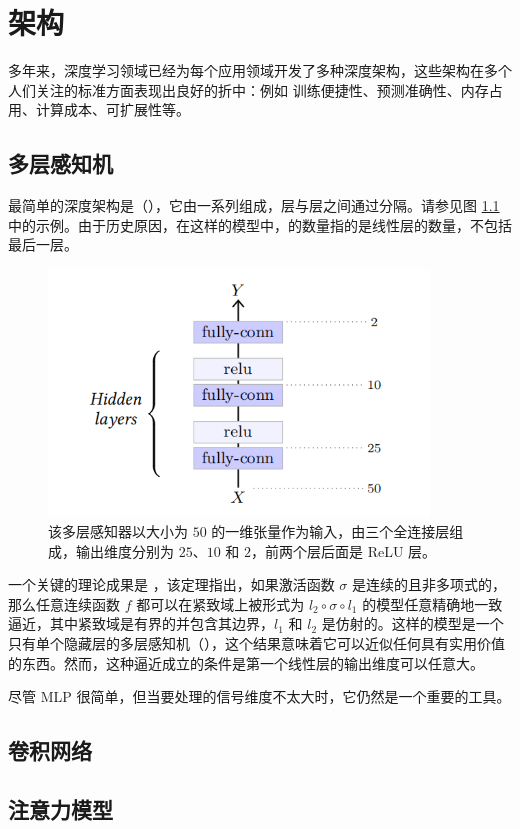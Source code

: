 \chapter{架构}\label{ch5}

多年来，深度学习领域已经为每个应用领域开发了多种深度架构，这些架构在多个人们关注的标准方面表现出良好的折中：例如 训练便捷性、预测准确性、内存占用、计算成本、可扩展性等。

\section{多层感知机}\label{sec5.1}

最简单的深度架构是（），它由一系列组成，层与层之间通过分隔。请参见图 \ref{fig5.1} 中的示例。由于历史原因，在这样的模型中，的数量指的是线性层的数量，不包括最后一层。

\begin{figure}
    \centering
    \includegraphics[width=0.9\textwidth]{fig/fig5.1.png}
    \caption[多层感知机]{该多层感知器以大小为 $50$ 的一维张量作为输入，由三个全连接层组成，输出维度分别为 $25$、$10$ 和 $2$，前两个层后面是 ReLU 层。}
    \label{fig5.1}
\end{figure}

一个关键的理论成果是 \citep{Cybenko1989}，该定理指出，如果激活函数 $\sigma$ 是连续的且非多项式的，那么任意连续函数 $f$ 都可以在紧致域上被形式为 $l_2 \circ \sigma \circ l_1$ 的模型任意精确地一致逼近，其中紧致域是有界的并包含其边界，$l_1$ 和 $l_2$ 是仿射的。这样的模型是一个只有单个隐藏层的多层感知机（），这个结果意味着它可以近似任何具有实用价值的东西。然而，这种逼近成立的条件是第一个线性层的输出维度可以任意大。

尽管 MLP 很简单，但当要处理的信号维度不太大时，它仍然是一个重要的工具。

\section{卷积网络}\label{sec5.2}

\section{注意力模型}\label{sec5.3}